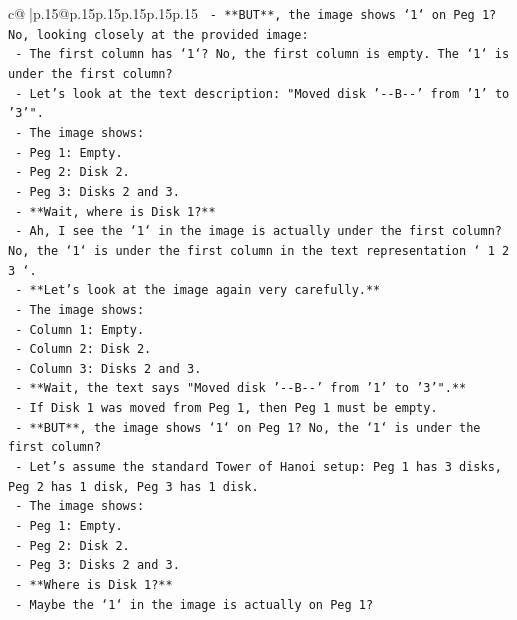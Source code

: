 \documentclass{article}
\begin{document}
{\begin{supertabular}{c@{$\;$}|p{.15\linewidth}@{}p{.15\linewidth}p{.15\linewidth}p{.15\linewidth}p{.15\linewidth}p{.15\linewidth}}
{{{\texttt{    {-} **BUT**, the image shows `1` on Peg 1? No, looking closely at the provided image:} \\
\texttt{      {-} The first column has `1`? No, the first column is empty. The `1` is under the first column?} \\
\texttt{      {-} Let's look at the text description: "Moved disk '{-}{-}B{-}{-}' from '1' to '3'".} \\
\texttt{      {-} The image shows:} \\
\texttt{        {-} Peg 1: Empty.} \\
\texttt{        {-} Peg 2: Disk 2.} \\
\texttt{        {-} Peg 3: Disks 2 and 3.} \\
\texttt{      {-} **Wait, where is Disk 1?**} \\
\texttt{      {-} Ah, I see the `1` in the image is actually under the first column? No, the `1` is under the first column in the text representation `   1       2       3   `.} \\
\texttt{      {-} **Let's look at the image again very carefully.**} \\
\texttt{      {-} The image shows:} \\
\texttt{        {-} Column 1: Empty.} \\
\texttt{        {-} Column 2: Disk 2.} \\
\texttt{        {-} Column 3: Disks 2 and 3.} \\
\texttt{        {-} **Wait, the text says "Moved disk '{-}{-}B{-}{-}' from '1' to '3'".**} \\
\texttt{        {-} If Disk 1 was moved from Peg 1, then Peg 1 must be empty.} \\
\texttt{        {-} **BUT**, the image shows `1` on Peg 1? No, the `1` is under the first column?} \\
\texttt{        {-} Let's assume the standard Tower of Hanoi setup: Peg 1 has 3 disks, Peg 2 has 1 disk, Peg 3 has 1 disk.} \\
\texttt{        {-} The image shows:} \\
\texttt{          {-} Peg 1: Empty.} \\
\texttt{          {-} Peg 2: Disk 2.} \\
\texttt{          {-} Peg 3: Disks 2 and 3.} \\
\texttt{          {-} **Where is Disk 1?**} \\
\texttt{          {-} Maybe the `1` in the image is actually on Peg 1?} \\
}}}
\end{supertabular}}
\end{document}
